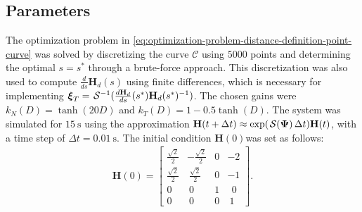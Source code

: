 \subsection{Parameters}
The optimization problem in \eqref{eq:optimization-problem-distance-definition-point-curve} was solved by discretizing the curve $\mathcal{C}$ using $\num{5000}$ points and determining the optimal $s=s^*$ through a brute-force approach. This discretization was also used to compute $\frac{d}{ds}\mathbf{H}_d(s)$ using finite differences, which is necessary for implementing $\boldsymbol{\xi}_T = \SL^{-1}(\frac{d\mathbf{H}_d}{ds}(s^*)\mathbf{H}_d(s^*)^{-1})$. The chosen gains were $k_N(D) = \tanh(20D)$ and $k_T(D) = 1 - 0.5\tanh(D)$. The system was simulated for $\qty{15}{\second}$ using the approximation $\mathbf{H}(t+\Delta t)\approx \exp(\SL[\boldsymbol{\Psi}]\Delta t)\mathbf{H}(t)$, with a time step of $\Delta t=\qty{0.01}{\second}$. The initial condition $\mathbf{H}(0)$was set as follows:
\begin{align}
    \mathbf{H}(0) = \begin{bmatrix}
        \frac{\sqrt{2}}{2} & -\frac{\sqrt{2}}{2} & 0 & -2\\
        \frac{\sqrt{2}}{2} & \ \frac{\sqrt{2}}{2} & 0 & -1\\
        0 & \ 0 & 1 & \ \ 0\\
        0 & \ 0 & 0 & \ 1
    \end{bmatrix}.
\end{align}

